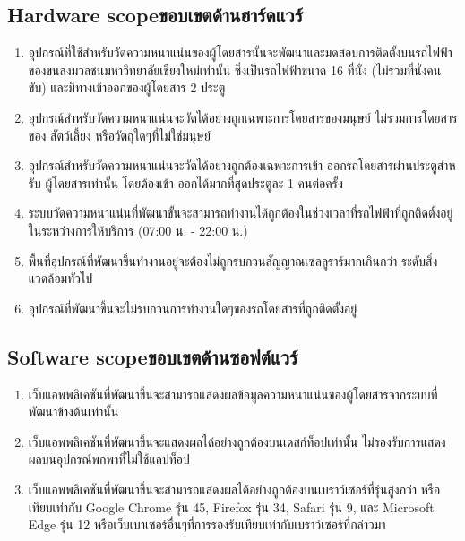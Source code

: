 \subsection{\ifenglish Hardware scope\else ขอบเขตด้านฮาร์ดแวร์\fi}
\begin{enumerate}
    \item อุปกรณ์ที่ใช้สำหรับวัดความหนาแน่นของผู้โดยสารนั้นจะพัฒนาและมดสอบการติดตั้งบนรถไฟฟ้าของขนส่งมวลชนมหาวิทยาลัยเชียงใหม่เท่านั้น ซึ่งเป็นรถไฟฟ้าขนาด 16 ที่นั่ง (ไม่รวมที่นั่งคนขับ) และมีทางเข้าออกของผู้โดยสาร 2 ประตู
    \item อุปกรณ์สําหรับวัดความหนาแน่นจะวัดได้อย่างถูกเฉพาะการโดยสารของมนุษย์ ไม่รวมการโดยสารของ
    สัตว์เลี้ยง หรือวัตถุใดๆที่ไม่ใช่มนุษย์
    \item อุปกรณ์สําหรับวัดความหนาแน่นจะวัดได้อย่างถูกต้องเฉพาะการเข้า-ออกรถโดยสารผ่านประตูสําหรับ
    ผู้โดยสารเท่านั้น โดยต้องเข้า-ออกได้มากที่สุดประตูละ 1 คนต่อครั้ง
    \item ระบบวัดความหนาแน่นที่พัฒนาขั้นจะสามารถทํางานได้ถูกต้องในช่วงเวลาที่รถไฟฟ้าที่ถูกติดตั้งอยู่ในระหว่างการให้บริการ (07:00 น. - 22:00 น.)
    \item พื้นที่อุปกรณ์ที่พัฒนาขึ้นทํางานอยู่จะต้องไม่ถูกรบกวนสัญญาณเซลลูราร์มากเกินกว่า
    ระดับสิ่งแวดล้อมทั่วไป
    \item อุปกรณ์ที่พัฒนาขึ้นจะไม่รบกวนการทำงานใดๆของรถโดยสารที่ถูกติดตั้งอยู่
\end{enumerate}

\subsection{\ifenglish Software scope\else ขอบเขตด้านซอฟต์แวร์\fi}
\begin{enumerate}
    \item เว็บแอพพลิเคชันที่พัฒนาขึ้นจะสามารถแสดงผลข้อมูลความหนาแน่นของผู้โดยสารจากระบบที่พัฒนาข้างต้นเท่านั้น
    \item เว็บแอพพลิเคชันที่พัฒนาขึ้นจะแสดงผลได้อย่างถูกต้องบนเดสก์ท็อปเท่านั้น ไม่รองรับการแสดงผลบนอุปกรณ์พกพาที่ไม่ใช้แลปท็อป
    \item เว็บแอพพลิเคชันที่พัฒนาขึ้นจะสามารถแสดงผลได้อย่างถูกต้องบนเบราว์เซอร์ที่รุ่นสูงกว่า หรือเทียบเท่ากับ Google Chrome รุ่น 45, Firefox รุ่น 34, Safari รุ่น 9, และ Microsoft Edge รุ่น 12 หรือเว็บเบาเซอร์อื่นๆที่การรองรับเทียบเท่ากับเบราว์เซอร์ที่กล่าวมา
\end{enumerate}

